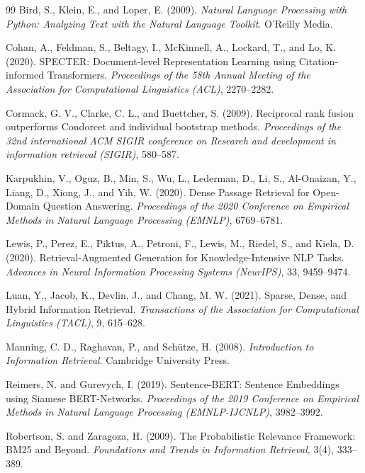 \documentclass[12pt]{article}
\begin{document}
\begin{thebibliography}{99}
\small
{} Bird, S., Klein, E., and Loper, E. (2009). \textit{Natural Language Processing with Python: Analyzing Text with the Natural Language Toolkit}. O'Reilly Media.

 Cohan, A., Feldman, S., Beltagy, I., McKinnell, A., Lockard, T., and Lo, K. (2020). SPECTER: Document-level Representation Learning using Citation-informed Transformers. \textit{Proceedings of the 58th Annual Meeting of the Association for Computational Linguistics (ACL)}, 2270--2282.

 Cormack, G. V., Clarke, C. L., and Buettcher, S. (2009). Reciprocal rank fusion outperforms Condorcet and individual bootstrap methods. \textit{Proceedings of the 32nd international ACM SIGIR conference on Research and development in information retrieval (SIGIR)}, 580--587.

 Karpukhin, V., Oguz, B., Min, S., Wu, L., Lederman, D., Li, S., Al-Onaizan, Y., Liang, D., Xiong, J., and Yih, W. (2020). Dense Passage Retrieval for Open-Domain Question Answering. \textit{Proceedings of the 2020 Conference on Empirical Methods in Natural Language Processing (EMNLP)}, 6769--6781.

 Lewis, P., Perez, E., Piktus, A., Petroni, F., Lewis, M., Riedel, S., and Kiela, D. (2020). Retrieval-Augmented Generation for Knowledge-Intensive NLP Tasks. \textit{Advances in Neural Information Processing Systems (NeurIPS)}, 33, 9459--9474.

 Luan, Y., Jacob, K., Devlin, J., and Chang, M. W. (2021). Sparse, Dense, and Hybrid Information Retrieval. \textit{Transactions of the Association for Computational Linguistics (TACL)}, 9, 615--628.

 Manning, C. D., Raghavan, P., and Schütze, H. (2008). \textit{Introduction to Information Retrieval}. Cambridge University Press.

 Reimers, N. and Gurevych, I. (2019). Sentence-BERT: Sentence Embeddings using Siamese BERT-Networks. \textit{Proceedings of the 2019 Conference on Empirical Methods in Natural Language Processing (EMNLP-IJCNLP)}, 3982--3992.

 Robertson, S. and Zaragoza, H. (2009). The Probabilistic Relevance Framework: BM25 and Beyond. \textit{Foundations and Trends in Information Retrieval}, 3(4), 333--389.
\end{thebibliography}
\end{document}

